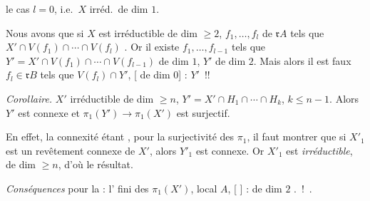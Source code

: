 \documentclass[11pt,a4paper]{article}
\begin{document}

 le cas $l = 0$, i.e.\ $X$ irréd.\ de dim $1$.

Nous avons  \ill{} \ill{} \ill{} que si $X$ est irréductible de dim $\geq 2$, \ill{} \ill{} \ill{} \ill{} $f_1, \ldots, f_l$ de $\mathfrak{r}A$ tels que $X' \cap V(f_1) \cap \cdots \cap V(f_l)$ . Or il existe $f_1, \ldots, f_{l-1}$ tels que $Y' = X' \cap V(f_1) \cap \cdots \cap V(f_{l-1})$ \ill{} \ill{} de dim $1$, \ill{} \ill{} \ill{} \ill{} $Y'$ \ill{} \ill{} de dim $2$. Mais alors il est faux \ill{} \ill{} $f_l \in \mathfrak{r}B$ tels que $V(f_l) \cap Y'$, [\ill{} \ill{} de dim $0$] \ill{} \ill{} \ill{} \ill{} : \ill{} \ill{} \ill{} \ill{} $Y'$ \ill{} \ill{} \ill{} \ill{}\,!!

\emph{Corollaire.} $X'$ irréductible \ill{} de dim $\geq n$,
$Y' = X' \cap H_1 \cap \cdots \cap H_k$, \ill{} $k \leq n-1$. Alors \struck{\ill{}} $Y'$ est connexe et $\pi_1(Y') \to \pi_1(X')$ est surjectif.

En effet, la connexité étant , pour la surjectivité des $\pi_1$, il faut montrer que si $X'_1$ est un revêtement  connexe de $X'$, alors $Y'_1$ est connexe. Or $X'_1$ est \emph{irréductible}, \ill{} de dim $\geq n$, d'où le résultat.

\emph{\struck{\ill{}} Conséquences} pour la  : \ill{} l' \ill{} fini des $\pi_1(X')$, \ill{} \ill{} local $A$, \ill{} \ill{} \ill{} \ill{} \ill{} \ill{} \ill{} \ill{} [\ill{} \ill{}] : \ill{} \ill{} \ill{} \ill{} \ill{} \ill{} \ill{} \ill{} \ill{} \ill{} \ill{} de dim $2$ \ill{} \ill{}. \struck{\ill{} \ill{}} \ill{} \ill{} \ill{} \ill{} \ill{} \ill{} \ill{} \ill{} \ill{} \ill{} \emph{\ill{}} \ill{} \ill{} \ill{} \ill{} \ill{}\,!\ \ill{}.
\end{document}
